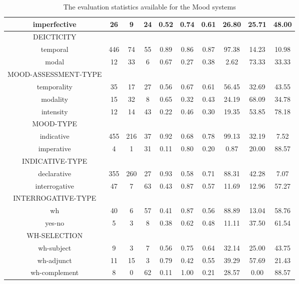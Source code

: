 \begin{table}[!ht]
{\begin{tabular}{|c|c|c|c|c|c|c|c|c|c|}
            imperfective & 26  & 9  & 24  & 0.52 & 0.74 & 0.61 & 26.80 & 25.71 & 48.00 \\ \hline
            DEICTICITY &  &  &  &  &  &  &  &  &  \\ \hline            
            temporal & 446 & 74 & 55 & 0.89 & 0.86 & 0.87 & 97.38 & 14.23 & 10.98 \\ \hline
            modal    & 12  & 33 & 6  & 0.67 & 0.27 & 0.38 & 2.62  & 73.33 & 33.33 \\ \hline
            MOOD-ASSESSMENT-TYPE  &  &  &  &  &  &  &  &  &  \\ \hline            
            temporality & 35 & 17 & 27 & 0.56 & 0.67 & 0.61 & 56.45 & 32.69 & 43.55 \\ \hline
            modality    & 15 & 32 & 8  & 0.65 & 0.32 & 0.43 & 24.19 & 68.09 & 34.78 \\ \hline
            intensity   & 12 & 14 & 43 & 0.22 & 0.46 & 0.30 & 19.35 & 53.85 & 78.18 \\ \hline
            MOOD-TYPE  &  &  &  &  &  &  &  &  &  \\ \hline                        
            indicative    & 455 & 216 & 37 & 0.92 & 0.68 & 0.78 & 99.13 & 32.19 & 7.52  \\ \hline
            imperative    & 4   & 1   & 31 & 0.11 & 0.80 & 0.20 & 0.87  & 20.00 & 88.57 \\ \hline
            INDICATIVE-TYPE  &  &  &  &  &  &  &  &  &  \\ \hline                        
            declarative   & 355 & 260 & 27 & 0.93 & 0.58 & 0.71 & 88.31 & 42.28 & 7.07  \\ \hline
            interrogative & 47  & 7   & 63 & 0.43 & 0.87 & 0.57 & 11.69 & 12.96 & 57.27 \\ \hline
            INTERROGATIVE-TYPE  &  &  &  &  &  &  &  &  &  \\ \hline   
            wh            & 40  & 6   & 57 & 0.41 & 0.87 & 0.56 & 88.89 & 13.04 & 58.76 \\ \hline
            yes-no        & 5   & 3   & 8  & 0.38 & 0.62 & 0.48 & 11.11 & 37.50 & 61.54 \\ \hline                     
            WH-SELECTION  &  &  &  &  &  &  &  &  &  \\ \hline                        
            wh-subject    & 9   & 3   & 7  & 0.56 & 0.75 & 0.64 & 32.14 & 25.00 & 43.75 \\ \hline
            wh-adjunct    & 11  & 15  & 3  & 0.79 & 0.42 & 0.55 & 39.29 & 57.69 & 21.43 \\ \hline
            wh-complement & 8   & 0   & 62 & 0.11 & 1.00 & 0.21 & 28.57 & 0.00  & 88.57 \\ \hline
        \end{tabular}
    }
    \caption{The evaluation statistics available for the Mood systems}
    \label{tab:features-mood-evaluation}
\end{table}


